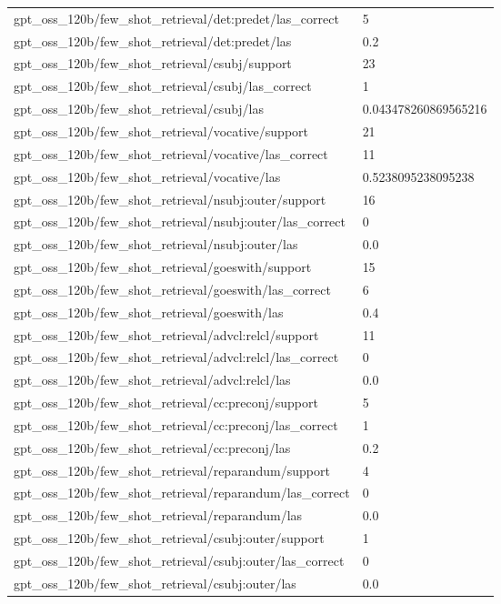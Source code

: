 \begin{tabular}{ll}
gpt\_oss\_120b/few\_shot\_retrieval/det:predet/las\_correct & 5 \\
gpt\_oss\_120b/few\_shot\_retrieval/det:predet/las & 0.2 \\
gpt\_oss\_120b/few\_shot\_retrieval/csubj/support & 23 \\
gpt\_oss\_120b/few\_shot\_retrieval/csubj/las\_correct & 1 \\
gpt\_oss\_120b/few\_shot\_retrieval/csubj/las & 0.043478260869565216 \\
gpt\_oss\_120b/few\_shot\_retrieval/vocative/support & 21 \\
gpt\_oss\_120b/few\_shot\_retrieval/vocative/las\_correct & 11 \\
gpt\_oss\_120b/few\_shot\_retrieval/vocative/las & 0.5238095238095238 \\
gpt\_oss\_120b/few\_shot\_retrieval/nsubj:outer/support & 16 \\
gpt\_oss\_120b/few\_shot\_retrieval/nsubj:outer/las\_correct & 0 \\
gpt\_oss\_120b/few\_shot\_retrieval/nsubj:outer/las & 0.0 \\
gpt\_oss\_120b/few\_shot\_retrieval/goeswith/support & 15 \\
gpt\_oss\_120b/few\_shot\_retrieval/goeswith/las\_correct & 6 \\
gpt\_oss\_120b/few\_shot\_retrieval/goeswith/las & 0.4 \\
gpt\_oss\_120b/few\_shot\_retrieval/advcl:relcl/support & 11 \\
gpt\_oss\_120b/few\_shot\_retrieval/advcl:relcl/las\_correct & 0 \\
gpt\_oss\_120b/few\_shot\_retrieval/advcl:relcl/las & 0.0 \\
gpt\_oss\_120b/few\_shot\_retrieval/cc:preconj/support & 5 \\
gpt\_oss\_120b/few\_shot\_retrieval/cc:preconj/las\_correct & 1 \\
gpt\_oss\_120b/few\_shot\_retrieval/cc:preconj/las & 0.2 \\
gpt\_oss\_120b/few\_shot\_retrieval/reparandum/support & 4 \\
gpt\_oss\_120b/few\_shot\_retrieval/reparandum/las\_correct & 0 \\
gpt\_oss\_120b/few\_shot\_retrieval/reparandum/las & 0.0 \\
gpt\_oss\_120b/few\_shot\_retrieval/csubj:outer/support & 1 \\
gpt\_oss\_120b/few\_shot\_retrieval/csubj:outer/las\_correct & 0 \\
gpt\_oss\_120b/few\_shot\_retrieval/csubj:outer/las & 0.0 \\

\end{tabular}
